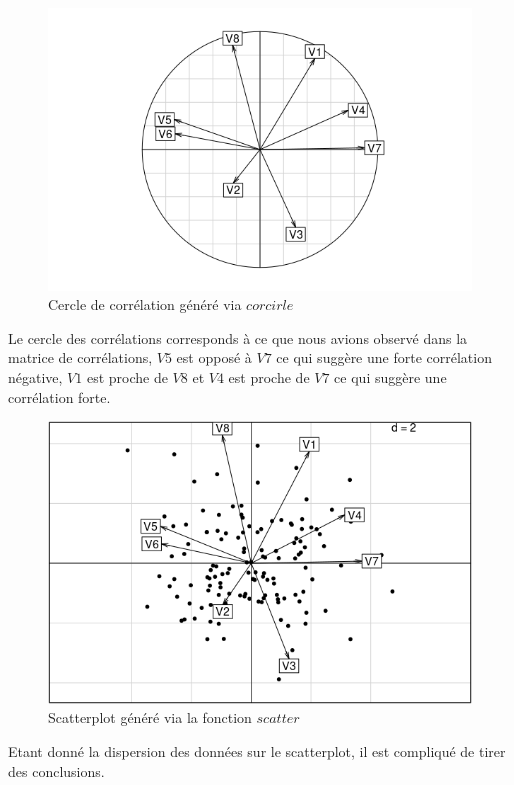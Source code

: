 \documentclass[11pt]{article}
\begin{document}
\begin{figure}[H]
\centering
\includegraphics[scale=1]{corrcircle.png}
\caption{Cercle de corrélation généré via $corcirle$}
\end{figure}
\noindent Le cercle des corrélations corresponds à ce que nous avions observé dans la matrice de corrélations, $V5$ est opposé à $V7$ ce qui suggère une forte corrélation négative, $V1$ est proche de $V8$ et $V4$ est proche de $V7$ ce qui suggère une corrélation forte.
\begin{figure}[H]
\centering
\includegraphics[scale=1]{scatter.png}
\caption{Scatterplot généré via la fonction $scatter$}
\end{figure}
Etant donné la dispersion des données sur le scatterplot, il est compliqué de tirer des conclusions.
\newpage
\end{document}
